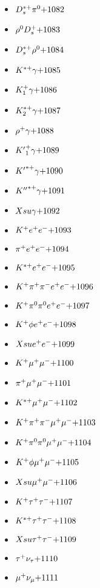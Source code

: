\begin{multicols}{3}
\begin{itemize}
 \item $ D_{s}^{*+} \pi^{0} \hfill{+1082}$
 \item $ \rho^{0} D_{s}^{+} \hfill{+1083}$
 \item $ D_{s}^{*+} \rho^{0} \hfill{+1084}$
 \item $ K^{*+} \gamma \hfill{+1085}$
 \item $ K_{1}^{+} \gamma \hfill{+1086}$
 \item $ K_{2}^{*+} \gamma \hfill{+1087}$
 \item $ \rho^{+} \gamma \hfill{+1088}$
 \item $ {K^{\prime}}_{1}^{+} \gamma \hfill{+1089}$
 \item $ {K^{\prime}}^{*+} \gamma \hfill{+1090}$
 \item $ {K^{\prime\prime}}^{*+} \gamma \hfill{+1091}$
 \item $ Xsu \gamma \hfill{+1092}$
 \item $ K^{+} e^{+} e^{-} \hfill{+1093}$
 \item $ \pi^{+} e^{+} e^{-} \hfill{+1094}$
 \item $ K^{*+} e^{+} e^{-} \hfill{+1095}$
 \item $ K^{+} \pi^{+} \pi^{-} e^{+} e^{-} \hfill{+1096}$
 \item $ K^{+} \pi^{0} \pi^{0} e^{+} e^{-} \hfill{+1097}$
 \item $ K^{+} \phi e^{+} e^{-} \hfill{+1098}$
 \item $ Xsu e^{+} e^{-} \hfill{+1099}$
 \item $ K^{+} \mu^{+} \mu^{-} \hfill{+1100}$
 \item $ \pi^{+} \mu^{+} \mu^{-} \hfill{+1101}$
 \item $ K^{*+} \mu^{+} \mu^{-} \hfill{+1102}$
 \item $ K^{+} \pi^{+} \pi^{-} \mu^{+} \mu^{-} \hfill{+1103}$
 \item $ K^{+} \pi^{0} \pi^{0} \mu^{+} \mu^{-} \hfill{+1104}$
 \item $ K^{+} \phi \mu^{+} \mu^{-} \hfill{+1105}$
 \item $ Xsu \mu^{+} \mu^{-} \hfill{+1106}$
 \item $ K^{+} \tau^{+} \tau^{-} \hfill{+1107}$
 \item $ K^{*+} \tau^{+} \tau^{-} \hfill{+1108}$
 \item $ Xsu \tau^{+} \tau^{-} \hfill{+1109}$
 \item $ \tau^{+} \nu_{\tau} \hfill{+1110}$
 \item $ \mu^{+} \nu_{\mu} \hfill{+1111}$

\end{itemize}
\end{multicols}
